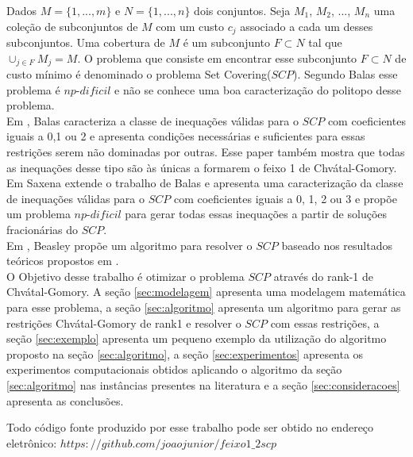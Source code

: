 \documentclass{proc}
\begin{document}
Dados $M=\{1,...,m\}$ e $N=\{1,...,n\}$ dois conjuntos. Seja $M_1$, $M_2$, ..., $M_n$ uma coleção de subconjuntos 
de $M$ com um custo $c_j$ associado a cada um desses subconjuntos. Uma cobertura de $M$ é um subconjunto 
$F \subset N$ tal que $\cup_{j \in F} M_j = M$. O problema que consiste em encontrar esse subconjunto $F \subset N$ de custo mínimo
é denominado o problema Set Covering($SCP$). Segundo Balas\cite{balas89} esse problema é $np$-$dificil$ e não se conhece uma boa caracterização do politopo desse
problema. \\
Em \cite{balas89}, Balas caracteriza a classe de inequações válidas para o $SCP$ com coeficientes iguais a 0,1 ou 2 e apresenta condições 
necessárias e suficientes para essas restrições serem não dominadas por outras. Esse paper também mostra que todas as inequações desse tipo são
às únicas a formarem o feixo 1 de Chvátal-Gomory. \\
Em \cite{saxena04} Saxena extende o trabalho de Balas\cite{balas89} e apresenta uma caracterização da classe de inequações válidas para o $SCP$ com 
coeficientes iguais a 0, 1, 2 ou 3 e propõe um problema $np$-$dificil$ para gerar todas essas inequações a partir de soluções fracionárias
do $SCP$. \\
Em \cite{Beasley87}, Beasley propõe um algoritmo para resolver o $SCP$ baseado nos resultados teóricos propostos em \cite{balas89}. \\
O Objetivo desse trabalho é otimizar o problema $SCP$ através do rank-1 de Chvátal-Gomory. A seção \ref{sec:modelagem} apresenta uma modelagem
matemática para esse problema, a seção \ref{sec:algoritmo} apresenta um algoritmo para gerar as restrições Chvátal-Gomory de rank1 e resolver
o $SCP$ com essas restrições, a seção \ref{sec:exemplo} apresenta um pequeno exemplo da utilização do algoritmo proposto na seção 
\ref{sec:algoritmo},
a seção \ref{sec:experimentos} apresenta os experimentos computacionais obtidos aplicando o algoritmo da seção \ref{sec:algoritmo} nas instâncias presentes na literatura e
a seção \ref{sec:consideracoes} apresenta as conclusões. 










Todo código fonte produzido por esse trabalho pode ser obtido no endereço eletrônico: $https://github.com/joaojunior/feixo1\_2scp$


\end{document}
